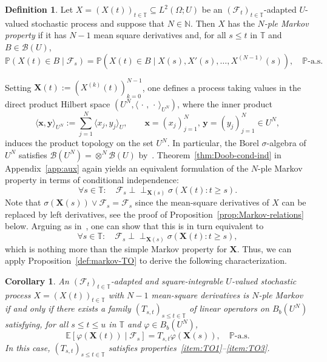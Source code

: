 \documentclass[reqno]{amsart}
\numberwithin{equation}{section}
\newcommand{\bbP}{\mathbb{P}}
\newcommand{\bbT}{\mathbb{T}}
\newcommand{\N}{\mathbb{N}}
\newcommand{\E}{\mathbb{E}}
\newcommand{\cB}{\mathcal{B}}
\newcommand{\cF}{\mathcal{F}}
\newcommand{\scalar}[2]{     \langle #1       \rangle_{ #2 }}
\newcommand{\ind}{\perp\!\!\!\perp}
\newtheorem{corollary}[lemma]{Corollary}
\theoremstyle{remark}
\theoremstyle{definition}
\newtheorem{definition}[lemma]{Definition}
\begin{document}
\begin{definition}\label{def:Nple-markov-Doob}
	Let $X = (X(t))_{t\in\bbT} \subseteq L^2(\Omega; U)$
	be an $(\cF_t)_{t\in\bbT}$-adapted $U$-valued
	stochastic process and suppose that $N \in \N$. 
	Then $X$ has the
	\emph{$N$-ple Markov property} if it
	has $N-1$ mean square derivatives 
	and, for all
	$s \le t$ in $\bbT$ and
	$B \in \cB(U)$,
	\begin{equation}\label{eq:Nple-markov-cond-prob}
		\bbP(X(t) \in B \mid \cF_s) = \bbP(X(t) \in B \mid X(s), X'(s), \dots, X^{(N-1)}(s)), 
		\quad 
		\bbP\text{-a.s.}
	\end{equation}
\end{definition}
%
Setting $\mathbf X(t) := (X^{(k)}(t))_{k=0}^{N-1}$, one defines
a process taking values in the direct product Hilbert space $(U^N, \scalar{\, \cdot \, , \, \cdot \,}{U^N}\!)$, where
the inner product
%
\begin{equation}
	\scalar{\mathbf x, \mathbf y}{U^N} := \sum_{j=1}^N \scalar{x_j,y_j}{U},
	\qquad
	\mathbf x = (x_j)_{j=1}^N, \, \mathbf y = (y_j)_{j=1}^N \in U^N \!,
\end{equation}
%
induces the product topology on the set $U^N$\!.
In particular, the Borel $\sigma$-algebra of $U^N$
satisfies $\cB(U^N) = \otimes^N \cB(U)$ by~\cite[Lemma~1.2]{Kallenberg2002}.
Theorem~\ref{thm:Doob-cond-ind}
in Appendix~\ref{app:aux} again yields an equivalent formulation of the $N$-ple Markov property
in terms of conditional independence:
%
\begin{equation}\label{eq:Nple-markov-cond-ind}
	\forall s \in \bbT : \quad  
	\cF_s \ind_{\mathbf X(s)}
	\sigma
	(X(t) : t \ge s).
\end{equation}
%
Note that $\sigma(\mathbf X(s)) \vee \cF_s = \cF_s$ since the mean-square derivatives of $X$ can be replaced
by left derivatives, see the proof of Proposition~\ref{prop:Markov-relations} below.
Arguing as in~\cite[Lemma~11.1]{Kallenberg2002}, one can show that this
is in turn equivalent to
%
\begin{equation}\label{eq:Nple-markov-cond-prob-vec}
	\forall s \in \bbT : \quad  
	\cF_s \ind_{\mathbf X(s)}
	\sigma
	(\mathbf X(t) : t \ge s)
	,
\end{equation}
%
which is nothing more than the simple Markov property
for $\mathbf X$. Thus, 
we can apply Proposition~\ref{def:markov-TO} to derive the following characterization.

%
\begin{corollary}\label{def:Nple-markov-TO}
	An $(\cF_t)_{t\in\bbT}$-adapted and square-integrable 
	$U$-valued stochastic process $X = (X(t))_{t\in\bbT}$
	with $N-1$ mean-square derivatives
	is $N$-ple Markov
	if and only if there
	exists a family $(T_{s,t})_{s \le t \in \bbT}$ 
	of linear operators on $B_b(U^N)$ satisfying, 
	for all $s \le t \le u$ in $\bbT$ and $\varphi \in B_b(U^N)$,
	\begin{equation}\label{eq:Nple-markov-cond-prob-TO}
		\E[\varphi(\mathbf X(t)) \mid \cF_s] = T_{s,t} \varphi(\mathbf X(s)),
		\quad 
		\bbP\text{-a.s.}
	\end{equation}
	In this case, $(T_{s,t})_{s \le t \in \bbT}$ satisfies properties~\ref{item:TO1}--\ref{item:TO3}.
\end{corollary}
%
\end{document}
